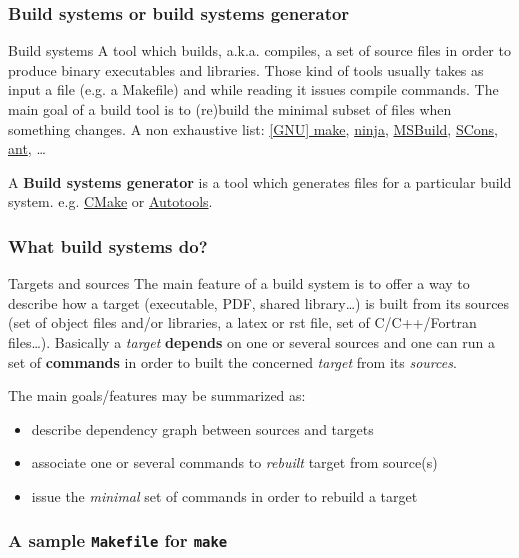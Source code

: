 \documentclass[compress,slidestop,table
              ]
               {beamer}
\begin{document}
\begin{frame}[fragile]
\frametitle{Build systems or build systems generator}
\begin{block}{Build systems}
A tool which builds, a.k.a. compiles, a set of source files in order to produce binary executables and libraries.
Those kind of tools usually takes as input a file (e.g. a Makefile) and while reading it issues compile commands.
The main goal of a build tool is to (re)build the minimal subset of files when something changes.
A non exhaustive list: \href{https://www.gnu.org/software/make/}{[GNU] make}, \href{https://ninja-build.org/}{ninja}, \href{https://github.com/Microsoft/msbuild}{MSBuild}, \href{http://www.scons.org}{SCons}, \href{http://ant.apache.org/}{ant}, \ldots
\end{block}
A \textbf{Build systems generator} is a tool which generates files for a particular build system. e.g. \href{http://cmake.org}{CMake} or \href{http://www.gnu.org/software/autoconf/}{Autotools}.
\end{frame}

\begin{frame}
  \frametitle{What build systems do?}
  \begin{block}{Targets and sources}
    The main feature of a build system is to offer a way to describe how a target (executable, PDF, shared library\ldots) is built from its sources (set of object files and/or libraries, a latex or rst file, set of C/C++/Fortran files\ldots). Basically a \emph{target} \textbf{depends} on one or several {sources} and one can run a set of \textbf{commands} in order to built the concerned \emph{target} from its \emph{sources}. 
  \end{block}
  The main goals/features may be summarized as:
  \begin{itemize}
  \item describe dependency graph between sources and targets
  \item associate one or several commands to \emph{rebuilt} target from source(s)
  \item issue the \emph{minimal} set of commands in order to rebuild a target
  \end{itemize}
\end{frame}

\begin{frame}[label=samplemakefile,fragile]
  \frametitle{A sample \texttt{Makefile} for \texttt{make}}

\end{frame}
\end{document}
